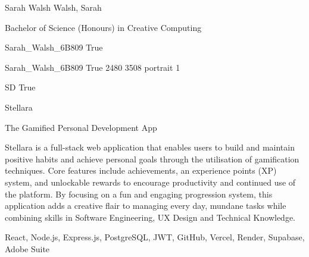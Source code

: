 
\begingroup{}\relax



\def\Key{Sarah_Walsh_6B809}

{Sarah Walsh}
{Walsh, Sarah}

{Bachelor of Science (Honours) in Creative Computing}

{Sarah_Walsh_6B809}
{True}

{Sarah_Walsh_6B809}
{True}
{2480}
{3508}
{portrait}
{1}

{SD}
{True}

{Stellara}

{The Gamified Personal Development App}

{Stellara is a full-stack web application that enables users to build and maintain positive habits and achieve personal goals through the utilisation of gamification techniques. Core features include achievements, an experience points (XP) system, and unlockable rewards to encourage productivity and continued use of the platform. By focusing on a fun and engaging progression system, this application adds a creative flair to managing every day, mundane tasks while combining skills in Software Engineering, UX Design and Technical Knowledge.}

{React, Node.js, Express.js, PostgreSQL, JWT, GitHub, Vercel, Render, Supabase, Adobe Suite}

